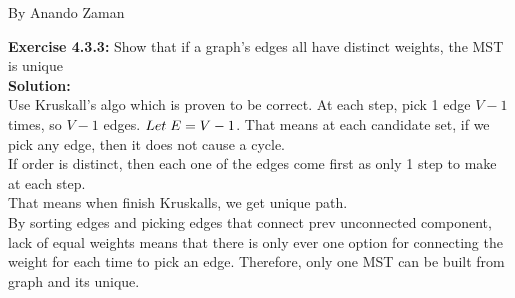 \documentclass[11pt,fleqn]{article}
\begin{document}
By Anando Zaman


\textbf{Exercise 4.3.3:} Show that if a graph’s edges all have distinct weights, the MST is unique\\

\textbf{Solution:}\\
Use Kruskall's algo which is proven to be correct. At each step, pick 1 edge $V-1$ times, so $V-1$ edges. $Let \thickspace E=V-1$. That means at each candidate set, if we pick any edge, then it does not cause a cycle.\\

If order is distinct, then each one of the edges come first as only 1 step to make at each step.\\

That means when finish Kruskalls, we get unique path.\\

By sorting edges and picking edges that connect prev unconnected component, lack of equal weights means that there is only ever one option for connecting the weight for each time to pick an edge. Therefore, only one MST can be built from graph and its unique.

	
\end{document}

